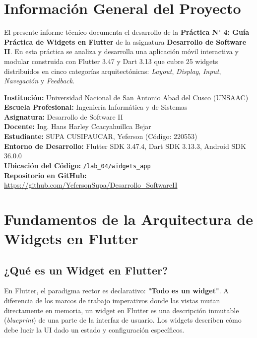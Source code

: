 \documentclass[12pt,a4paper]{article}
\begin{document}
\section{Información General del Proyecto}

El presente informe técnico documenta el desarrollo de la \textbf{Práctica N$^\circ$ 4: Guía Práctica de Widgets en Flutter} de la asignatura \textbf{Desarrollo de Software II}. En esta práctica se analiza y desarrolla una aplicación móvil interactiva y modular construida con Flutter 3.47 y Dart 3.13 que cubre 25 widgets distribuidos en cinco categorías arquitectónicas: \textit{Layout}, \textit{Display}, \textit{Input}, \textit{Navegación} y \textit{Feedback}.

\begin{tcolorbox}[colback=calloutbg,colframe=calloutborder,title=\textbf{Ficha Técnica de la Práctica 04}]
\textbf{Institución:} Universidad Nacional de San Antonio Abad del Cusco (UNSAAC)\\
\textbf{Escuela Profesional:} Ingeniería Informática y de Sistemas\\
\textbf{Asignatura:} Desarrollo de Software II\\
\textbf{Docente:} Ing. Hans Harley Ccacyahuillca Bejar\\
\textbf{Estudiante:} SUPA CUSIPAUCAR, Yeferson (Código: 220553)\\
\textbf{Entorno de Desarrollo:} Flutter SDK 3.47.4, Dart SDK 3.13.3, Android SDK 36.0.0\\
\textbf{Ubicación del Código:} \texttt{/lab\_04/widgets\_app}\\
\textbf{Repositorio en GitHub:} \url{https://github.com/YefersonSupa/Desarrollo_SoftwareII}
\end{tcolorbox}

\section{Fundamentos de la Arquitectura de Widgets en Flutter}

\subsection{¿Qué es un Widget en Flutter?}
En Flutter, el paradigma rector es declarativo: \textbf{"Todo es un widget"}. A diferencia de los marcos de trabajo imperativos donde las vistas mutan directamente en memoria, un widget en Flutter es una descripción inmutable (\textit{blueprint}) de una parte de la interfaz de usuario. Los widgets describen cómo debe lucir la UI dado un estado y configuración específicos.
\end{document}
